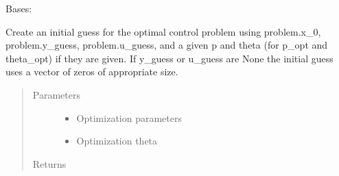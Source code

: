\documentclass[letterpaper,10pt,english]{sphinxmanual}
\begin{document}
\begin{fulllineitems}
\label{\detokenize{yaocptool.methods.classic:yaocptool.methods.classic.collocationscheme.CollocationScheme}}
Bases: {\hyperref[\detokenize{yaocptool.methods.base:yaocptool.methods.base.discretizationschemebase.DiscretizationSchemeBase}]{}}

\begin{fulllineitems}
\label{\detokenize{yaocptool.methods.classic:yaocptool.methods.classic.collocationscheme.CollocationScheme.create_initial_guess}}
Create an initial guess for the optimal control problem using problem.x\_0, problem.y\_guess, problem.u\_guess,
and a given p and theta (for p\_opt and theta\_opt) if they are given.
If y\_guess or u\_guess are None the initial guess uses a vector of zeros of appropriate size.
\begin{quote}\begin{description}
\item[{Parameters}] \leavevmode\begin{itemize}
\item {} 
 \textendash{} Optimization parameters

\item {} 
 \textendash{} Optimization theta

\end{itemize}

\item[{Returns}] \leavevmode


\end{description}\end{quote}

\end{fulllineitems}



\end{fulllineitems}
\end{document}
